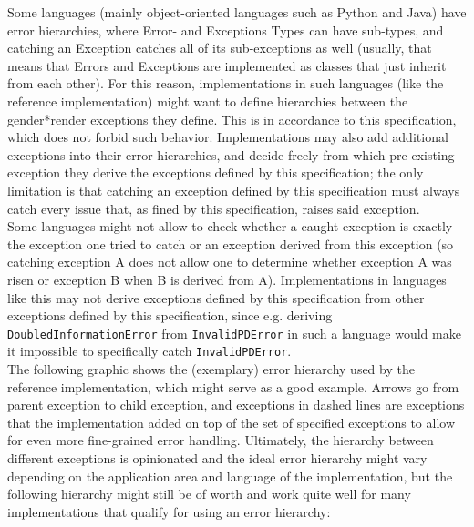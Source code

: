 \documentclass{article}
\newcommand{\GenderRender}{
    gender*render
}
\begin{document}
    Some languages (mainly object-oriented languages such as Python and Java) have error hierarchies, where Error- and Exceptions Types can have sub-types, and catching an Exception catches all of its sub-exceptions as well (usually, that means that Errors and Exceptions are implemented as classes that just inherit from each other).
    For this reason, implementations in such languages (like the reference implementation) might want to define hierarchies between the \GenderRender exceptions they define.
    This is in accordance to this specification, which does not forbid such behavior.
    Implementations may also add additional exceptions into their error hierarchies, and decide freely from which pre-existing exception they derive the exceptions defined by this specification;
    the only limitation is that catching an exception defined by this specification must always catch every issue that, as fined by this specification, raises said exception.\\

    Some languages might not allow to check whether a caught exception is exactly the exception one tried to catch or an exception derived from this exception (so catching exception A does not allow one to determine whether exception A was risen or exception B when B is derived from A).
    Implementations in languages like this may not derive exceptions defined by this specification from other exceptions defined by this specification, since e.g. deriving \texttt{DoubledInformationError} from \texttt{InvalidPDError} in such a language would make it impossible to specifically catch \texttt{InvalidPDError}.\\

    The following graphic shows the (exemplary) error hierarchy used by the reference implementation, which might serve as a good example.
    Arrows go from parent exception to child exception, and exceptions in dashed lines are exceptions that the implementation added on top of the set of specified exceptions to allow for even more fine-grained error handling.
    Ultimately, the hierarchy between different exceptions is opinionated and the ideal error hierarchy might vary depending on the application area and language of the implementation, but the following hierarchy might still be of worth and work quite well for many implementations that qualify for using an error hierarchy:\\
\end{document}
